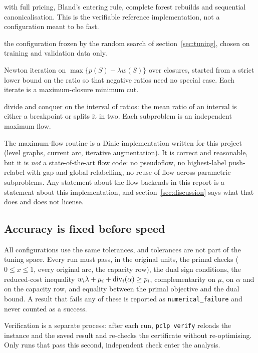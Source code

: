 \begin{description}[leftmargin=2.4em,style=nextline]
  \item[\texttt{forest-reference}] \FS{} with full pricing, Bland's entering
    rule, complete forest rebuilds and sequential canonicalisation. This is the
    verifiable reference implementation, not a configuration meant to be fast.
  \item[\texttt{forest-tuned}] the configuration frozen by the random search of
    section~\ref{sec:tuning}, chosen on training and validation data only.
  \item[\texttt{dinkelbach}] Newton iteration on
    $\max\{p(S)-\lambda w(S)\}$ over closures, started from a strict lower bound
    on the ratio so that negative ratios need no special case. Each iterate is a
    maximum-closure minimum cut.
  \item[\texttt{parametric}] divide and conquer on the interval of ratios: the
    mean ratio of an interval is either a breakpoint or splits it in two. Each
    subproblem is an independent maximum flow.
\end{description}

The maximum-flow routine is a Dinic implementation written for this project
(level graphs, current arc, iterative augmentation). It is correct and
reasonable, but it is \emph{not} a state-of-the-art flow code: no pseudoflow, no
highest-label push-relabel with gap and global relabelling, no reuse of flow
across parametric subproblems. Any statement about the flow backends in this
report is a statement about this implementation, and
section~\ref{sec:discussion} says what that does and does not license.

\subsection{Accuracy is fixed before speed}

All configurations use the same tolerances, and tolerances are not part of the
tuning space. Every run must pass, in the original units, the primal checks
($0 \le x \le 1$, every original arc, the capacity row), the dual sign
conditions, the reduced-cost inequality
$w_i\lambda + \mu_i + \operatorname{div}_i(\alpha) \ge p_i$, complementarity on $\mu$, on
$\alpha$ and on the capacity row, and equality between the primal objective and
the dual bound. A result that fails any of these is reported as
\texttt{numerical\_failure} and never counted as a success.

Verification is a separate process: after each run, \texttt{pclp verify} reloads
the instance and the saved result and re-checks the certificate without
re-optimising. Only runs that pass this second, independent check enter the
analysis.
